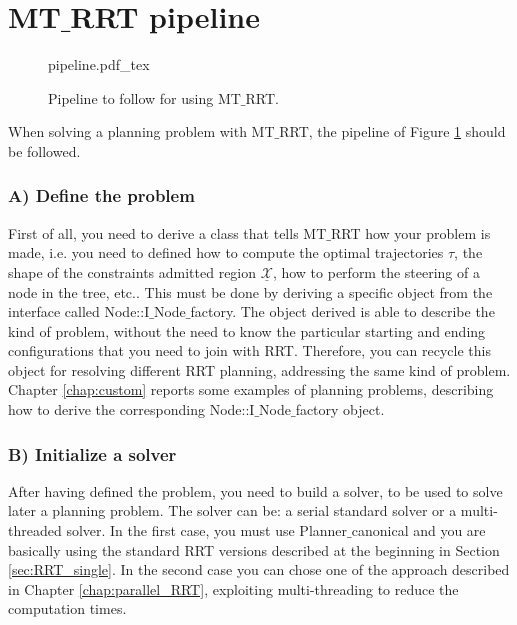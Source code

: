 \section{MT$\_$RRT pipeline}
\label{sec:pipeline}

 \begin{figure}
	 \centering
 \def\svgwidth{0.9 \columnwidth}
 {pipeline.pdf_tex} 
	 \caption{Pipeline to follow for using MT$\_$RRT.}
 \label{fig:pipeline}
 \end{figure}

When solving a planning problem with MT$\_$RRT, the pipeline of Figure \ref{fig:pipeline} should be followed.

\subsubsection{A) Define the problem}

First of all, you need to derive a class that tells MT$\_$RRT how your problem is made, i.e. you need to defined how to compute the optimal trajectories $\tau$, the shape of the constraints admitted region $\underline{\mathcal{X}}$, how to perform the steering of a node in the tree, etc..
This must be done by deriving a specific object from the interface called Node::I$\_$Node$\_$factory. The object derived is able to describe the kind of problem, without the need to know the particular starting and ending configurations that you need to join with RRT. Therefore, you can recycle this object for resolving different RRT planning, addressing the same kind of problem. Chapter \ref{chap:custom} reports some examples of planning problems, describing how to derive the corresponding Node::I$\_$Node$\_$factory object.

\subsubsection{B) Initialize a solver}

After having defined the problem, you need to build a solver, to be used to solve later a planning problem.
The solver can be: a serial standard solver or a multi-threaded solver.
In the first case, you must use Planner$\_$canonical and you are basically using the standard RRT versions described at the beginning in Section \ref{sec:RRT_single}. In the second case you can chose one of the approach described in Chapter \ref{chap:parallel_RRT}, exploiting multi-threading to reduce the computation times. 

